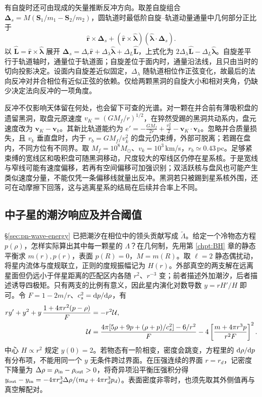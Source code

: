 有自旋时还可由现成的矢量推断反冲方向。取差自旋组合 $\bm\Delta_s=M(\bm S_1/m_1-\bm S_2/m_2)$，圆轨道时最低阶自旋--轨道动量通量中几何部分正比于
\[
 \hat{\bm r}\mathbin{\times}\bm\Delta_s+
 (\hat{\bm r}\mathbin{\times}\hat{\bm\lambda})
                     (\hat{\bm\lambda}\cdot\bm\Delta_s).
\]
以 $\hat{\bm L}=\hat{\bm r}\times\hat{\bm\lambda}$ 展开 $\bm\Delta_s=\Delta_r\hat{\bm r}+\Delta_\lambda\hat{\bm\lambda}+\Delta_L\hat{\bm L}$，上式化为 $2\Delta_\lambda\hat{\bm L}-\Delta_L\hat{\bm\lambda}$。自旋差平行于轨道轴时，通量位于轨道面；自旋差位于面内时，通量沿法线，且只由当时的切向投影决定。设面内自旋差近似固定，$\Delta_\lambda$ 随轨道相位作正弦变化，故最后的法向反冲对并合相位有近似正弦的依赖。仅给两颗黑洞的自旋大小和相对夹角，仍缺少决定法向反冲的一项角度。

反冲不仅影响天体留在何处，也会留下可查的光谱。对一颗在并合前有薄吸积盘的遗留黑洞，取盘元原速度 $v_K=(GM_f/r)^{1/2}$，在猝然受踢的黑洞共动系内，盘元速度改为 $\bm v_K-\bm v_k$。其新比轨道能约为 $e'=-\frac{GM_f}{2r}+\frac{v_k^2}{2}-\bm v_K\cdot\bm v_k$。忽略并合质量损失，且 $v_k$ 垂直盘时，内于 $r_b=GM_f/v_k^2$ 的盘元仍束缚，外部可脱离；若踢在盘内，不同方位有不同界。取 $M_f=10^8M_\odot$、$v_k=10^3$\,km/s，$r_b\simeq0.43$\,pc。足够紧束缚的宽线区和吸积盘可随黑洞移动，尺度较大的窄线区仍停在星系核。于是宽线与窄线可能有速度偏移，若再有空间偏移可加强识别；双活跃核与盘风也可能产生类似速度分量，不能仅凭一条偏移线就量出反冲。黑洞若只被踢到星系核外围，还可在动摩擦下回落，这与逃离星系的结局在后续并合率上不同。

\subsection{中子星的潮汐响应及并合阈值}

\S\ref{sec:pn-wave-energy} 已把潮汐在相位中的领头贡献写成 $\widetilde\Lambda$。给定一个冷物态方程 $p(\rho)$，怎样实际算出其中每一颗星的 $\Lambda$？在几何制，先用第 \ref{chpt:BH} 章的静态平衡求 $m(r),p(r)$，表面 $p(R)=0$，$M=m(R)$。取 $\ell=2$ 静态偶扰动，将星内流体与度规联立，正则的度规振幅记为 $H(r)$。外部真空的两支解在远离星面但仍远小于伴星距离的匹配区内各随 $r^2$、$r^{-3}$ 变；前者描述外加潮汐，后者描述诱导四极矩。只有两支的比例有意义，因此星内演化对数导数 $y=r H'/H$ 即可。令 $F=1-2m/r$、$c_s^2=\dd p/\dd\rho$，有
\begin{align*}
 r y'+y^2+y\,\frac{1+4\pi r^2(p-\rho)}{F}&=-r^2{\cal U},\\
 {\cal U}&=\frac{4\pi[5\rho+9p+(\rho+p)/c_s^2]-6/r^2}{F}
   -4\left[\frac{m+4\pi r^3p}{r^2F}\right]^2 .
\end{align*}
中心 $H\propto r^2$ 规定 $y(0)=2$。若物态有一阶相变，密度会跳变，方程里的 $\dd\rho/\dd p$ 有分布项，不能用同一个 $y$ 无条件跨过界面。在压强连续的界面 $r=r_d$，记密度下降量为 $\Delta\rho=\rho_{\rm in}-\rho_{\rm out}>0$，将奇异项沿平衡压强积分得 $y_{\rm out}-y_{\rm in}=-4\pi r_d^3\Delta\rho/(m_d+4\pi r_d^3 p_d)$。表面密度非零时，也须先取其外侧值再与真空解配对。

